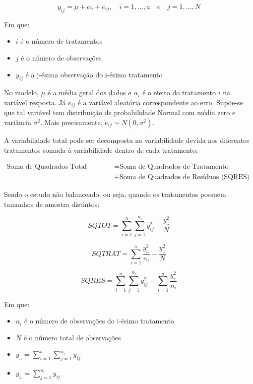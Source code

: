 \documentclass[
]{estat/estat}
\begin{document}
\[
y_{ij} = \mu + \alpha_i + e_{ij}, \quad i=1,…,a \quad e \quad j=1,…,N
\]

Em que:

\begin{itemize}
\item
  \(i\) é o número de tratamentos
\item
  \(j\) é o número de observações
\item
  \(y_{ij}\) é a j-ésima observação do i-ésimo tratamento
\end{itemize}

No modelo, \(\mu\) é a média geral dos dados e \(\alpha_i\) é o efeito
do tratamento \(i\) na variável resposta. Já \(e_{ij}\) é a variável
aleatória correspondente ao erro. Supõe-se que tal variável tem
distribuição de probabilidade Normal com média zero e variância
\(\sigma^2\). Mais precisamente, \(e_{ij} \sim N(0,\sigma^2)\).

A variabilidade total pode ser decomposta na variabilidade devida aos
diferentes tratamentos somada à variabilidade dentro de cada tratamento:

\begin{align*}
\text{Soma de Quadrados Total (SQTOT)} &= \text{Soma de Quadrados de Tratamento (SQTRAT)} \\
&+ \text{Soma de Quadrados de Resíduos (SQRES)}
\end{align*}

Sendo o estudo não balanceado, ou seja, quando os tratamentos possuem
tamanhos de amostra distintos:

\[
SQTOT = \sum\limits_{i=1}^a \sum\limits_{j=1}^{n_i} y_{ij}^2 - \frac{y_{..}^2}{N}
\]

\[
SQTRAT = \sum\limits_{i=1}^a \frac{y_{i.}^2}{n_i} - \frac{y_{..}^2}{N}
\]

\[
SQRES = \sum\limits_{i=1}^a \sum\limits_{j=1}^{n_i} y_{ij}^2 - \sum\limits_{i=1}^a \frac{y_{i.}^2}{n_i}
\]

Em que:

\begin{itemize}
\item
  \(n_i\) é o número de observações do i-ésimo tratamento
\item
  \(N\) é o número total de observações
\item
  \(y_{..} = \sum\limits_{i=1}^a \sum\limits_{j=1}^{n_i} y_{ij}\)
\item
  \(y_{i.} = \sum\limits_{j=1}^{n_i} y_{ij}\)
\end{itemize}
\end{document}
